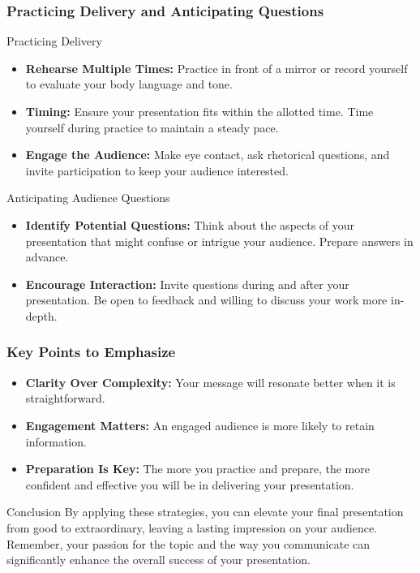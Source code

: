 \documentclass[aspectratio=169]{beamer}
\begin{document}
\begin{frame}[fragile]
    \frametitle{Practicing Delivery and Anticipating Questions}
    \begin{block}{Practicing Delivery}
        \begin{itemize}
            \item \textbf{Rehearse Multiple Times:} 
            Practice in front of a mirror or record yourself to evaluate your body language and tone.
            \item \textbf{Timing:} 
            Ensure your presentation fits within the allotted time. Time yourself during practice to maintain a steady pace.
            \item \textbf{Engage the Audience:} 
            Make eye contact, ask rhetorical questions, and invite participation to keep your audience interested.
        \end{itemize}
    \end{block}

    \begin{block}{Anticipating Audience Questions}
        \begin{itemize}
            \item \textbf{Identify Potential Questions:} 
            Think about the aspects of your presentation that might confuse or intrigue your audience. Prepare answers in advance.
            \item \textbf{Encourage Interaction:} 
            Invite questions during and after your presentation. Be open to feedback and willing to discuss your work more in-depth.
        \end{itemize}
    \end{block}
\end{frame}

\begin{frame}[fragile]
    \frametitle{Key Points to Emphasize}
    \begin{itemize}
        \item \textbf{Clarity Over Complexity:} Your message will resonate better when it is straightforward.
        \item \textbf{Engagement Matters:} An engaged audience is more likely to retain information.
        \item \textbf{Preparation Is Key:} 
        The more you practice and prepare, the more confident and effective you will be in delivering your presentation.
    \end{itemize}
    
    \begin{block}{Conclusion}
        By applying these strategies, you can elevate your final presentation from good to extraordinary, 
        leaving a lasting impression on your audience. 
        Remember, your passion for the topic and the way you communicate can significantly enhance the overall success of your presentation.
    \end{block}
\end{frame}
\end{document}
